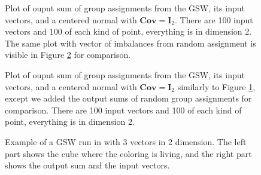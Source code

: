 \documentclass[12pt]{article}
\begin{document}
\begin{figure}[h]

\caption{Plot of ouput sum of group assignments from the GSW, its input vectors, and a centered normal with $\textbf{Cov}=\textbf{I}_2$. There are 100 input vectors and 100 of each kind of point, everything is in dimension 2. The same plot with vector of imbalances from random assignment is visible in Figure \ref{4types_4} for comparison.}
\label{4types_3}
\end{figure}
\begin{figure}[h]

\caption{Plot of ouput sum of group assignments from the GSW, its input vectors, and a centered normal with $\textbf{Cov}=\textbf{I}_2$ similarly to Figure \ref{4types_3}, except we added the output sums of random group assignments for comparison. There are 100 input vectors and 100 of each kind of point, everything is in dimension 2.}
\label{4types_4}
\end{figure}

\begin{figure}
\begin{center}
\newpage
{}
\caption{Example of a GSW run in with 3 vectors in 2 dimension. The left part shows the cube where the coloring is living, and the right part shows the output sum and the input vectors.}
\label{3d_example}
\end{center}
\end{figure}
\end{document}
